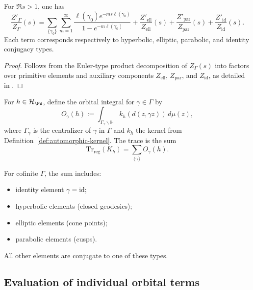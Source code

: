 \begin{lemma}
\label{lem:zeta-decomposition}
For $\Re s>1$, one has
\[
\frac{Z'_\Gamma}{Z_\Gamma}(s)
= \sum_{\{\gamma_0\}}\sum_{m=1}^{\infty}
\frac{\ell(\gamma_0)e^{-ms\ell(\gamma_0)}}{1 - e^{-m\ell(\gamma_0)}}
+\frac{Z'_{\mathrm{ell}}}{Z_{\mathrm{ell}}}(s)
+\frac{Z'_{\mathrm{par}}}{Z_{\mathrm{par}}}(s)
+\frac{Z'_{\mathrm{id}}}{Z_{\mathrm{id}}}(s).
\]
Each term corresponds respectively to hyperbolic, elliptic, parabolic, and identity conjugacy types.
\end{lemma}

\begin{proof}\relax
Follows from the Euler-type product decomposition of $Z_\Gamma(s)$ into factors over primitive elements and auxiliary components $Z_{\mathrm{ell}}$, $Z_{\mathrm{par}}$, and $Z_{\mathrm{id}}$, as detailed in \cite[§11]{Hejhal1983vol2}. \relax
\end{proof}

\begin{definition}
\label{def:orbital-integrals}
For $h\in\mathcal{H}_{\PW}$, define the orbital integral for $\gamma\in\Gamma$ by
\[
O_\gamma(h) := \int_{\Gamma_\gamma\backslash\mathbb{H}}
k_h(d(z,\gamma z))\,d\mu(z),
\]
where $\Gamma_\gamma$ is the centralizer of $\gamma$ in $\Gamma$ and $k_h$ the kernel from Definition~\ref{def:automorphic-kernel}. The trace is the sum
\[
\mathrm{Tr}_{\mathrm{reg}}(K_h)=\sum_{\{\gamma\}}O_\gamma(h).
\]
\end{definition}

\begin{remark}
For cofinite $\Gamma$, the sum includes:
\begin{itemize}
  \item identity element $\gamma=\mathrm{id}$;
  \item hyperbolic elements (closed geodesics);
  \item elliptic elements (cone points);
  \item parabolic elements (cusps).
\end{itemize}
All other elements are conjugate to one of these types. \relax
\end{remark}

\subsection{Evaluation of individual orbital terms}
\label{subsec:ch4-part5-terms} \relax

